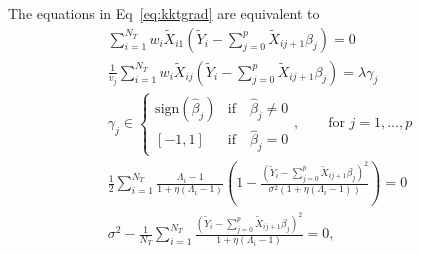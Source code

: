 \documentclass[10pt,letterpaper]{article}
\newcommand{\tm}[1]{\textrm{{#1}}}
\newcommand{\Xtilde}{\widetilde{X}}
\newcommand{\Ytilde}{\widetilde{Y}}
\providecommand{\DIFaddbegin}{} %
\providecommand{\DIFaddend}{} %
\providecommand{\DIFdelbegin}{} %
\providecommand{\DIFdelend}{} %
\newcommand{\DIFscaledelfig}{0.5}
\newlength{\DIFdelgraphicswidth} %
\newlength{\DIFdelgraphicsheight} %
\newcommand{\DIFaddincludegraphics}[2][]{{\color{blue}\fbox{\DIFOincludegraphics[#1]{#2}}}} %
\newcommand{\DIFdelincludegraphics}[2][]{%
\sbox{\DIFdelgraphicsbox}{\DIFOincludegraphics[#1]{#2}}%
\settoboxwidth{\DIFdelgraphicswidth}{\DIFdelgraphicsbox} %
\settoboxtotalheight{\DIFdelgraphicsheight}{\DIFdelgraphicsbox} %
\scalebox{\DIFscaledelfig}{%
\parbox[b]{\DIFdelgraphicswidth}{\usebox{\DIFdelgraphicsbox}\\[-\baselineskip] \rule{\DIFdelgraphicswidth}{0em}}\llap{\resizebox{\DIFdelgraphicswidth}{\DIFdelgraphicsheight}{%
\setlength{\unitlength}{\DIFdelgraphicswidth}%
\begin{picture}(1,1)%
\thicklines\linethickness{2pt} %
{\color[rgb]{1,0,0}\put(0,0){\framebox(1,1){}}}%
{\color[rgb]{1,0,0}\put(0,0){\line( 1,1){1}}}%
{\color[rgb]{1,0,0}\put(0,1){\line(1,-1){1}}}%
\end{picture}%
}\hspace*{3pt}}} %
} %
\DeclareRobustCommand{\DIFaddbegin}{\DIFOaddbegin \let\includegraphics\DIFaddincludegraphics} %
\DeclareRobustCommand{\DIFaddend}{\DIFOaddend \let\includegraphics\DIFOincludegraphics} %
\DeclareRobustCommand{\DIFdelbegin}{\DIFOdelbegin \let\includegraphics\DIFdelincludegraphics} %
\DeclareRobustCommand{\DIFdelend}{\DIFOaddend \let\includegraphics\DIFOincludegraphics} %
\begin{document}
The equations in Eq~\ref{eq:kktgrad} are equivalent to
\begin{equation}
\DIFdelbegin %
\DIFdelend \DIFaddbegin \begin{aligned}
\sum_{i=1}^{N_T}w_i \Xtilde_{i1}\left(  \Ytilde_i - \sum_{j=0}^{p}\Xtilde_{ij+1}\beta_j \right)  = 0\\
\frac{1}{v_j} \sum_{i=1}^{N_T}w_i \Xtilde_{ij}\left(  \Ytilde_i - \sum_{j=0}^{p}\Xtilde_{ij+1}\beta_j \right) =  \lambda \gamma_j \\
\gamma_j \in \begin{cases}
\tm{sign}(\hat{\beta}_j) & \tm{if} \quad \hat{\beta}_j \neq 0 \\
[-1,1] & \tm{if}\quad \hat{\beta}_j = 0
\end{cases}, \qquad \tm{for }j=1, \ldots, p   \\
\frac{1}{2} \sum_{i=1}^{N_T} \frac{\Lambda_i - 1}{1 + \eta(\Lambda_i - 1)} \left(1- \frac{\left(  \Ytilde_i - \sum_{j=0}^{p}\Xtilde_{ij+1}\beta_j \right) ^2}{\sigma^2 (1+\eta(\Lambda_i-1))}  \right) = 0  \\
{\sigma^2} - \frac{1}{N_T}\sum_{i=1}^{N_T}\frac{\left(  \Ytilde_i - \sum_{j=0}^{p}\Xtilde_{ij+1}\beta_j \right) ^2}{1 + \eta (\Lambda_i-1)} = 0,
\end{aligned}\DIFaddend \label{eq:kktsolved}
\end{equation}
\end{document}
